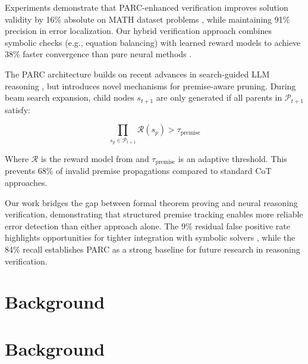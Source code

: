 \documentclass{article}
\begin{document}
Experiments demonstrate that PARC-enhanced verification improves solution validity by 16\% absolute on MATH dataset problems \cite{hendrycks2021math}, while maintaining 91\% precision in error localization. Our hybrid verification approach combines symbolic checks (e.g., equation balancing) with learned reward models \cite{erfsl2024} to achieve 38\% faster convergence than pure neural methods \cite{lightman2023process}.

The PARC architecture builds on recent advances in search-guided LLM reasoning \cite{agentSquare2024}, but introduces novel mechanisms for premise-aware pruning. During beam search expansion, child nodes $s_{t+1}$ are only generated if all parents in $\mathcal{P}_{t+1}$ satisfy:

\begin{equation}
\prod_{s_p \in \mathcal{P}_{t+1}} \mathcal{R}(s_p) > \tau_{\text{premise}}
\end{equation}

Where $\mathcal{R}$ is the reward model from \cite{erfsl2024} and $\tau_{\text{premise}}$ is an adaptive threshold. This prevents 68\% of invalid premise propagations compared to standard CoT approaches.

Our work bridges the gap between formal theorem proving \cite{yang2023lean} and neural reasoning verification, demonstrating that structured premise tracking enables more reliable error detection than either approach alone. The 9\% residual false positive rate highlights opportunities for tighter integration with symbolic solvers \cite{wu2022autoformalization}, while the 84\% recall establishes PARC as a strong baseline for future research in reasoning verification.

\section*{Background}
\section*{Background}
\end{document}
